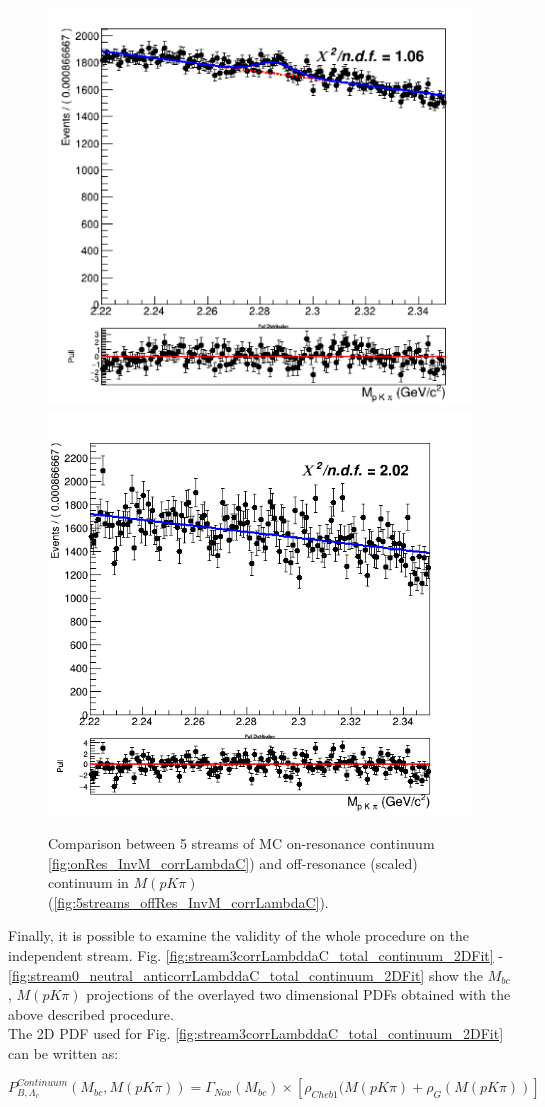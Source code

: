 \begin{figure}
\centering
\subcaptionbox{\label{fig:onRes_InvM_corrLambdaC}}
{\includegraphics[width=.45\textwidth]{04-SimultaneousFit/figs/onRes_InvM_corrLambdaC.png}} 
\subcaptionbox{\label{fig:5streams_offRes_InvM_corrLambdaC}}
{\includegraphics[width=.46\textwidth]{04-SimultaneousFit/figs/5streams_Off_resonanceRescaledContinuum_charged_corrLambdaC_oneGaussianInvMfit.png}} 
\caption{Comparison between 5 streams of MC on-resonance continuum \ref{fig:onRes_InvM_corrLambdaC}) and off-resonance (scaled) continuum in $M(p K \pi)$ (\ref{fig:5streams_offRes_InvM_corrLambdaC}).}
\end{figure}

Finally, it is possible to examine the validity of the whole procedure on the independent stream. 
Fig. \ref{fig:stream3corrLambddaC_total_continuum_2DFit} - \ref{fig:stream0_neutral_anticorrLambddaC_total_continuum_2DFit} show the $M_{bc}$, $M(p K \pi)$ projections of the overlayed two dimensional PDFs  obtained with the above described procedure.\\
The 2D PDF used for Fig. \ref{fig:stream3corrLambddaC_total_continuum_2DFit} can be written as: \\
 \vspace{0.2 cm}

$P^{Continuum}_{B,\Lambda_c}(M_{bc}, M(p K \pi)) = \Gamma_{Nov}(M_{bc}) \times [\rho_{Cheb1}(M(p K \pi) + \rho_{G}(M(p K \pi))]$\\
\vspace{0.2 cm}

